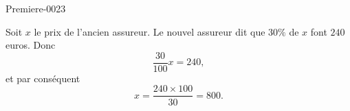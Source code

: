 
\begin{corrige}{Premiere-0023}

    Soit \( x\) le prix de l'ancien assureur. Le nouvel assureur dit que \( 30\%\) de \( x\) font \( 240\) euros. Donc
    \begin{equation}
        \frac{ 30 }{ 100 }x=240,
    \end{equation}
    et par conséquent 
    \begin{equation}
        x=\frac{ 240\times 100 }{ 30 }=800.
    \end{equation}

\end{corrige}
